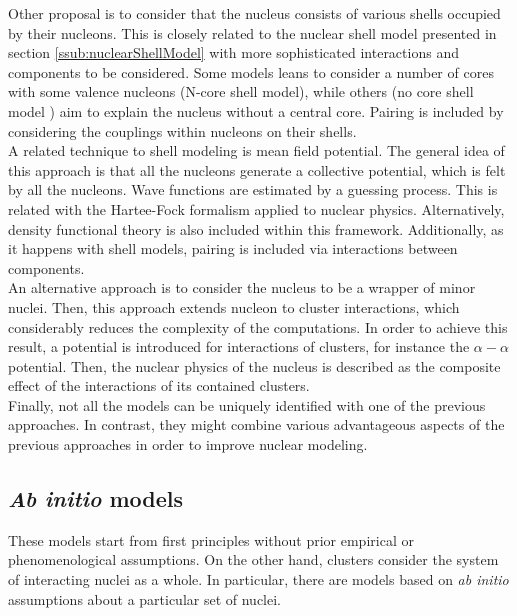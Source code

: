 \documentclass[openany]{book}
\begin{document}
Other proposal is to consider that the nucleus consists of various shells occupied by their nucleons. This is closely related to the nuclear shell model presented in section \ref{ssub:nuclearShellModel} with more sophisticated interactions and components to be considered. Some models leans to consider a number of cores with some valence nucleons (N-core shell model), while others (no core shell model ) aim to explain the nucleus without a central core. Pairing is included by considering the couplings within nucleons on their shells.  \\

A related technique to shell modeling is mean field potential. The general idea of this approach is that all the nucleons generate a collective potential, which is felt by all the nucleons. Wave functions are estimated by a guessing process. This is related with the Hartee-Fock formalism applied to nuclear physics. Alternatively, density functional theory is also included within this framework. Additionally, as it happens with shell models, pairing is included via interactions between components. \\

An alternative approach is to consider the nucleus to be a wrapper of minor nuclei. Then, this approach extends nucleon to cluster interactions, which considerably reduces the complexity of the computations. In order to achieve this result, a potential is introduced for interactions of clusters, for instance the $\alpha-\alpha$ potential. Then, the nuclear physics of the nucleus is described as the composite effect of the interactions of its contained clusters. \\

Finally, not all the models can be uniquely identified with one of the previous approaches. In contrast, they might combine various advantageous aspects of the previous approaches in order to improve nuclear modeling.\\

\subsection{\textit{Ab initio} models} \label{sub:microscopical_abinitio}

These models start from first principles without prior empirical or phenomenological assumptions. 
On the other hand, clusters consider the system of interacting nuclei as a whole. In particular, there are models based on \textit{ab initio} assumptions about a particular set of nuclei.  \\
 
\end{document}
